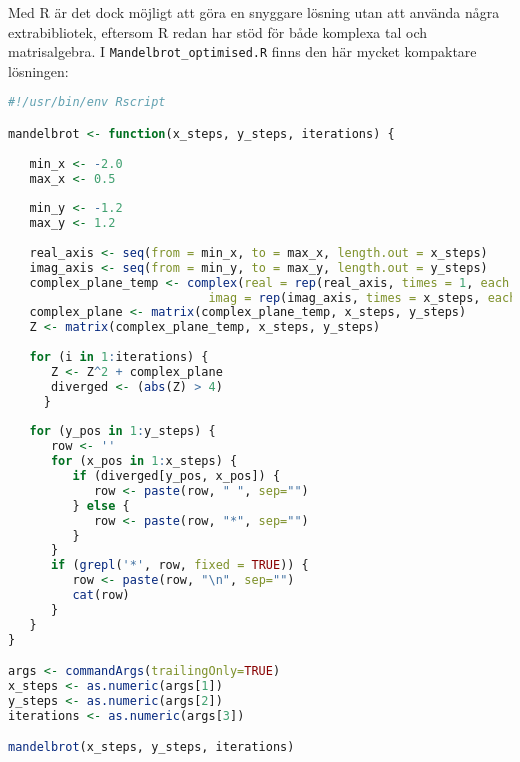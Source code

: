 \documentclass[10pt, twoside,a4paper]{article}
\begin{document}
Med R är det dock möjligt att göra en snyggare lösning utan att använda några extrabibliotek, eftersom R redan har stöd för både komplexa tal och matrisalgebra. I \verb+Mandelbrot_optimised.R+ finns den här mycket kompaktare lösningen:
\begin{lstlisting}[language=R]
#!/usr/bin/env Rscript

mandelbrot <- function(x_steps, y_steps, iterations) {
   
   min_x <- -2.0
   max_x <- 0.5
   
   min_y <- -1.2
   max_y <- 1.2
   
   real_axis <- seq(from = min_x, to = max_x, length.out = x_steps)
   imag_axis <- seq(from = min_y, to = max_y, length.out = y_steps)
   complex_plane_temp <- complex(real = rep(real_axis, times = 1, each = y_steps),
                            imag = rep(imag_axis, times = x_steps, each = 1))
   complex_plane <- matrix(complex_plane_temp, x_steps, y_steps)
   Z <- matrix(complex_plane_temp, x_steps, y_steps)
   
   for (i in 1:iterations) { 
      Z <- Z^2 + complex_plane
      diverged <- (abs(Z) > 4)
     }
   
   for (y_pos in 1:y_steps) {
      row <- ''
      for (x_pos in 1:x_steps) {
         if (diverged[y_pos, x_pos]) {
            row <- paste(row, " ", sep="")
         } else {
            row <- paste(row, "*", sep="")
         }
      }
      if (grepl('*', row, fixed = TRUE)) {
         row <- paste(row, "\n", sep="")
         cat(row)
      }
   }
}

args <- commandArgs(trailingOnly=TRUE)
x_steps <- as.numeric(args[1])
y_steps <- as.numeric(args[2])
iterations <- as.numeric(args[3])

mandelbrot(x_steps, y_steps, iterations)
\end{lstlisting}

\newpage
\end{document}
